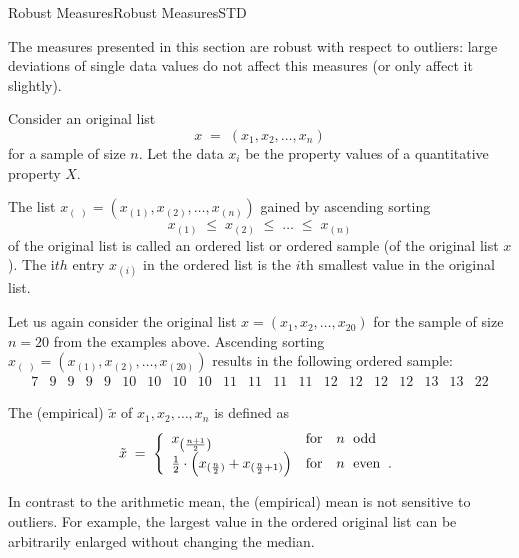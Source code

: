 \begin{MXContent}{Robust Measures}{Robust Measures}{STD}

The measures presented in this section are robust with respect to outliers: large deviations 
of single data values do not affect this measures (or only affect it slightly).

Consider an original list
$$
x\; =\;(x_{1},x_{2},\ldots ,x_{n})
$$
for a sample of size $n$. Let the data $x_{i}$ be the property values of a quantitative property $X$. 

\begin{MInfo}

The list $x_{(\; )}=(x_{(1)},x_{(2)},\ldots ,x_{(n)})$ gained by ascending sorting
$$
x_{(1)}\;\leq\; x_{(2)}\;\leq \;\ldots\;\leq\; x_{(n)}
$$
of the original list is called an ordered list or ordered sample (of the original list $x$). 
The i$th$ entry $x_{(i)}$ in the ordered list is the $i$th smallest value in the original list.
\end{MInfo}

\begin{MExample}
Let us again consider the original list $x=(x_{1},x_{2},\ldots ,x_{20})$ for the sample of size 
$n=20$ from the examples above. Ascending sorting 
$x_{(\; )}=(x_{(1)},x_{(2)},\ldots ,x_{(20)})$  results in the following ordered sample:
$$
\begin{array}{cccccccccccccccccccc} 7 & 9 & 9 & 9 & 9 & 10 & 10 & 10 & 10 & 11 & 11 & 11 & 11 & 12 & 12 & 12 & 12 & 13 & 13 & 22 \end{array}
$$
\end{MExample}

\begin{MInfo}
The (empirical)  $\tilde{x}$ of $x_{1},x_{2},\ldots ,x_{n}$ is defined as
$$
\tilde{x}\;=\;\left\lbrace{\begin{array}{lll}x_{\left(\frac{n+1}{2}\right)} & \text{for} & n\;\text{ odd}\\
\frac{1}{2}\cdot \left( x_{(\frac{n}{2})}+ x_{(\frac{n}{2}+1)} \right) & \text{for} &n\;\text{ even\: .}\end{array}}\right.
$$
\end{MInfo}

In contrast to the arithmetic mean, the (empirical) mean is not sensitive to outliers. For example, the largest 
value in the ordered original list can be arbitrarily enlarged without changing the median. 


\end{MXContent}
